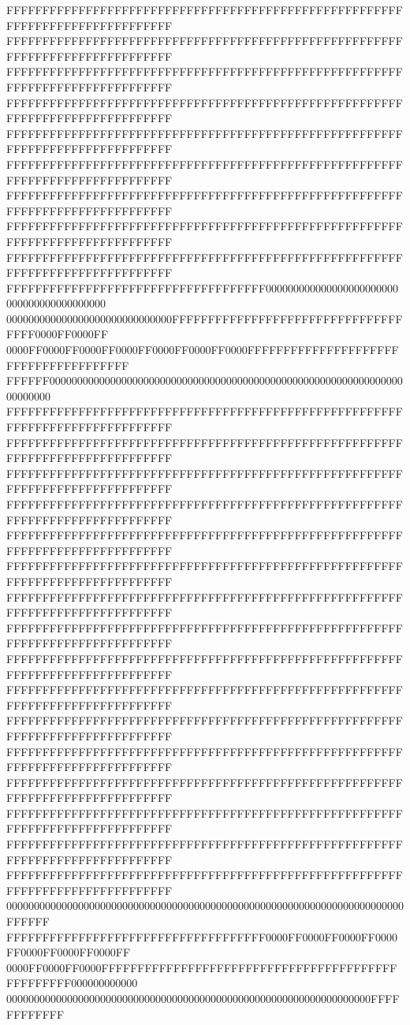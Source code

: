 FFFFFFFFFFFFFFFFFFFFFFFFFFFFFFFFFFFFFFFFFFFFFFFFFFFFFFFFFFFFFFFFFFFFFFFFFFFFFF
FFFFFFFFFFFFFFFFFFFFFFFFFFFFFFFFFFFFFFFFFFFFFFFFFFFFFFFFFFFFFFFFFFFFFFFFFFFFFF
FFFFFFFFFFFFFFFFFFFFFFFFFFFFFFFFFFFFFFFFFFFFFFFFFFFFFFFFFFFFFFFFFFFFFFFFFFFFFF
FFFFFFFFFFFFFFFFFFFFFFFFFFFFFFFFFFFFFFFFFFFFFFFFFFFFFFFFFFFFFFFFFFFFFFFFFFFFFF
FFFFFFFFFFFFFFFFFFFFFFFFFFFFFFFFFFFFFFFFFFFFFFFFFFFFFFFFFFFFFFFFFFFFFFFFFFFFFF
FFFFFFFFFFFFFFFFFFFFFFFFFFFFFFFFFFFFFFFFFFFFFFFFFFFFFFFFFFFFFFFFFFFFFFFFFFFFFF
FFFFFFFFFFFFFFFFFFFFFFFFFFFFFFFFFFFFFFFFFFFFFFFFFFFFFFFFFFFFFFFFFFFFFFFFFFFFFF
FFFFFFFFFFFFFFFFFFFFFFFFFFFFFFFFFFFFFFFFFFFFFFFFFFFFFFFFFFFFFFFFFFFFFFFFFFFFFF
FFFFFFFFFFFFFFFFFFFFFFFFFFFFFFFFFFFFFFFFFFFFFFFFFFFFFFFFFFFFFFFFFFFFFFFFFFFFFF
FFFFFFFFFFFFFFFFFFFFFFFFFFFFFFFFFFFF000000000000000000000000000000000000000000
000000000000000000000000000000FFFFFFFFFFFFFFFFFFFFFFFFFFFFFFFFFFFF0000FF0000FF
0000FF0000FF0000FF0000FF0000FF0000FF0000FFFFFFFFFFFFFFFFFFFFFFFFFFFFFFFFFFFFFF
FFFFFF000000000000000000000000000000000000000000000000000000000000000000000000
FFFFFFFFFFFFFFFFFFFFFFFFFFFFFFFFFFFFFFFFFFFFFFFFFFFFFFFFFFFFFFFFFFFFFFFFFFFFFF
FFFFFFFFFFFFFFFFFFFFFFFFFFFFFFFFFFFFFFFFFFFFFFFFFFFFFFFFFFFFFFFFFFFFFFFFFFFFFF
FFFFFFFFFFFFFFFFFFFFFFFFFFFFFFFFFFFFFFFFFFFFFFFFFFFFFFFFFFFFFFFFFFFFFFFFFFFFFF
FFFFFFFFFFFFFFFFFFFFFFFFFFFFFFFFFFFFFFFFFFFFFFFFFFFFFFFFFFFFFFFFFFFFFFFFFFFFFF
FFFFFFFFFFFFFFFFFFFFFFFFFFFFFFFFFFFFFFFFFFFFFFFFFFFFFFFFFFFFFFFFFFFFFFFFFFFFFF
FFFFFFFFFFFFFFFFFFFFFFFFFFFFFFFFFFFFFFFFFFFFFFFFFFFFFFFFFFFFFFFFFFFFFFFFFFFFFF
FFFFFFFFFFFFFFFFFFFFFFFFFFFFFFFFFFFFFFFFFFFFFFFFFFFFFFFFFFFFFFFFFFFFFFFFFFFFFF
FFFFFFFFFFFFFFFFFFFFFFFFFFFFFFFFFFFFFFFFFFFFFFFFFFFFFFFFFFFFFFFFFFFFFFFFFFFFFF
FFFFFFFFFFFFFFFFFFFFFFFFFFFFFFFFFFFFFFFFFFFFFFFFFFFFFFFFFFFFFFFFFFFFFFFFFFFFFF
FFFFFFFFFFFFFFFFFFFFFFFFFFFFFFFFFFFFFFFFFFFFFFFFFFFFFFFFFFFFFFFFFFFFFFFFFFFFFF
FFFFFFFFFFFFFFFFFFFFFFFFFFFFFFFFFFFFFFFFFFFFFFFFFFFFFFFFFFFFFFFFFFFFFFFFFFFFFF
FFFFFFFFFFFFFFFFFFFFFFFFFFFFFFFFFFFFFFFFFFFFFFFFFFFFFFFFFFFFFFFFFFFFFFFFFFFFFF
FFFFFFFFFFFFFFFFFFFFFFFFFFFFFFFFFFFFFFFFFFFFFFFFFFFFFFFFFFFFFFFFFFFFFFFFFFFFFF
FFFFFFFFFFFFFFFFFFFFFFFFFFFFFFFFFFFFFFFFFFFFFFFFFFFFFFFFFFFFFFFFFFFFFFFFFFFFFF
FFFFFFFFFFFFFFFFFFFFFFFFFFFFFFFFFFFFFFFFFFFFFFFFFFFFFFFFFFFFFFFFFFFFFFFFFFFFFF
FFFFFFFFFFFFFFFFFFFFFFFFFFFFFFFFFFFFFFFFFFFFFFFFFFFFFFFFFFFFFFFFFFFFFFFFFFFFFF
000000000000000000000000000000000000000000000000000000000000000000000000FFFFFF
FFFFFFFFFFFFFFFFFFFFFFFFFFFFFFFFFFFF0000FF0000FF0000FF0000FF0000FF0000FF0000FF
0000FF0000FF0000FFFFFFFFFFFFFFFFFFFFFFFFFFFFFFFFFFFFFFFFFFFFFFFFFF000000000000
000000000000000000000000000000000000000000000000000000000000000000FFFFFFFFFFFF
